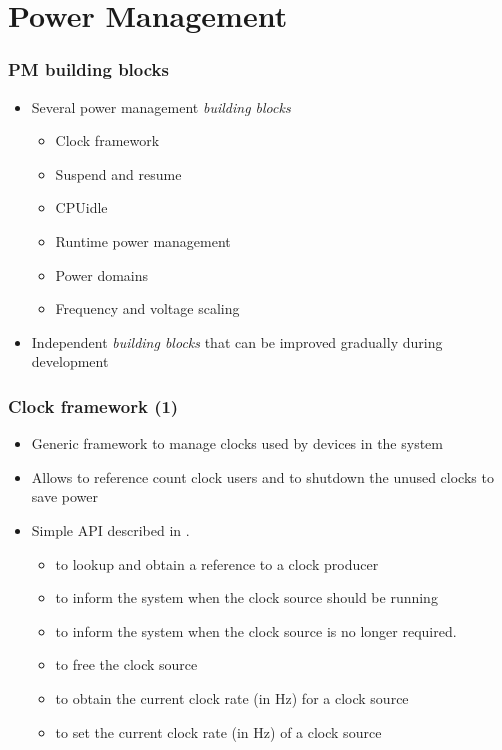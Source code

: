 \section{Power Management}

\begin{frame}
  \frametitle{PM building blocks}
  \begin{itemize}
  \item Several power management \emph{building blocks}
    \begin{itemize}
    \item Clock framework
    \item Suspend and resume
    \item CPUidle
    \item Runtime power management
    \item Power domains
    \item Frequency and voltage scaling
    \end{itemize}
  \item Independent \emph{building blocks} that can be improved
    gradually during development
  \end{itemize}
\end{frame}

\begin{frame}
  \frametitle{Clock framework (1)}
  \begin{itemize}
  \item Generic framework to manage clocks used by devices in the
    system
  \item Allows to reference count clock users and to shutdown the
    unused clocks to save power
  \item Simple API described in .
    \begin{itemize}
    \item {} to lookup and obtain a reference to a clock producer
    \item {} to inform the system when the clock source should be running
    \item {} to inform the system when the clock source is no longer required.
    \item {} to free the clock source
    \item {} to obtain the current clock rate (in Hz) for a clock source
    \item {} to set the current clock rate (in Hz) of a clock source
    \end{itemize}
  \end{itemize}
\end{frame}



